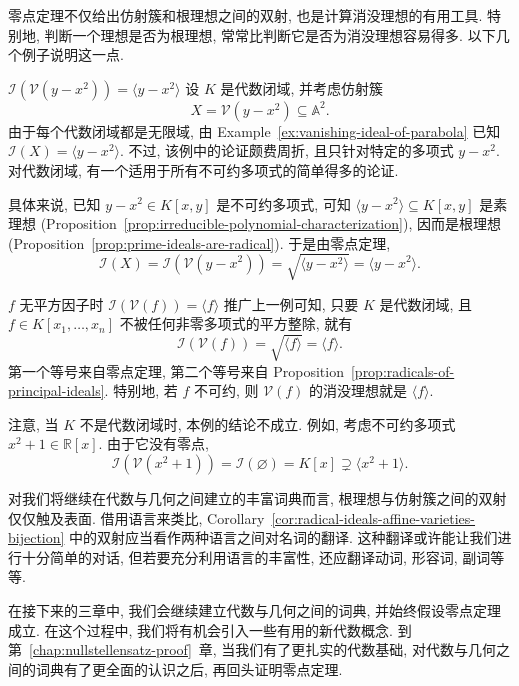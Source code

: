 零点定理不仅给出仿射簇和根理想之间的双射, 也是计算消没理想的有用工具. 特别地, 判断一个理想是否为根理想, 常常比判断它是否为消没理想容易得多. 以下几个例子说明这一点.

\begin{Example}{$\mathcal{I}(\mathcal{V}(y-x^{2}))=\langle y-x^{2}\rangle$}\leavevmode\label{ex:parabola-nullstellensatz}
  设 $K$ 是代数闭域, 并考虑仿射簇
  \[
    X=\mathcal{V}(y-x^{2})\subseteq\mathbb{A}^{2}.
  \]
  由于每个代数闭域都是无限域, 由 Example~\ref{ex:vanishing-ideal-of-parabola} 已知 $\mathcal{I}(X)=\langle y-x^{2}\rangle$. 不过, 该例中的论证颇费周折, 且只针对特定的多项式 $y-x^{2}$. 对代数闭域, 有一个适用于所有不可约多项式的简单得多的论证.

  具体来说, 已知 $y-x^{2}\in K[x,y]$ 是不可约多项式, 可知 $\langle y-x^{2}\rangle\subseteq K[x,y]$ 是素理想 (Proposition~\ref{prop:irreducible-polynomial-characterization}), 因而是根理想 (Proposition~\ref{prop:prime-ideals-are-radical}). 于是由零点定理,
  \[
    \mathcal{I}(X)=\mathcal{I}(\mathcal{V}(y-x^{2}))
      =\sqrt{\langle y-x^{2}\rangle}=\langle y-x^{2}\rangle.
  \]
\end{Example}

\begin{Example}{$f$ 无平方因子时 $\mathcal{I}(\mathcal{V}(f))=\langle f\rangle$}\leavevmode\label{ex:square-free-polynomial-nullstellensatz}
  推广上一例可知, 只要 $K$ 是代数闭域, 且 $f\in K[x_{1},\ldots,x_{n}]$ 不被任何非零多项式的平方整除, 就有
  \[
    \mathcal{I}(\mathcal{V}(f))=\sqrt{\langle f\rangle}=\langle f\rangle.
  \]
  第一个等号来自零点定理, 第二个等号来自 Proposition~\ref{prop:radicals-of-principal-ideals}. 特别地, 若 $f$ 不可约, 则 $\mathcal{V}(f)$ 的消没理想就是 $\langle f\rangle$.

  注意, 当 $K$ 不是代数闭域时, 本例的结论不成立. 例如, 考虑不可约多项式 $x^{2}+1\in\mathbb{R}[x]$. 由于它没有零点,
  \[
    \mathcal{I}(\mathcal{V}(x^{2}+1))=\mathcal{I}(\varnothing)
      =K[x]\supsetneq\langle x^{2}+1\rangle.
  \]
\end{Example}

对我们将继续在代数与几何之间建立的丰富词典而言, 根理想与仿射簇之间的双射仅仅触及表面. 借用语言来类比, Corollary~\ref{cor:radical-ideals-affine-varieties-bijection} 中的双射应当看作两种语言之间对名词的翻译. 这种翻译或许能让我们进行十分简单的对话, 但若要充分利用语言的丰富性, 还应翻译动词, 形容词, 副词等等.

在接下来的三章中, 我们会继续建立代数与几何之间的词典, 并始终假设零点定理成立. 在这个过程中, 我们将有机会引入一些有用的新代数概念. 到第~\ref{chap:nullstellensatz-proof}~章, 当我们有了更扎实的代数基础, 对代数与几何之间的词典有了更全面的认识之后, 再回头证明零点定理.

